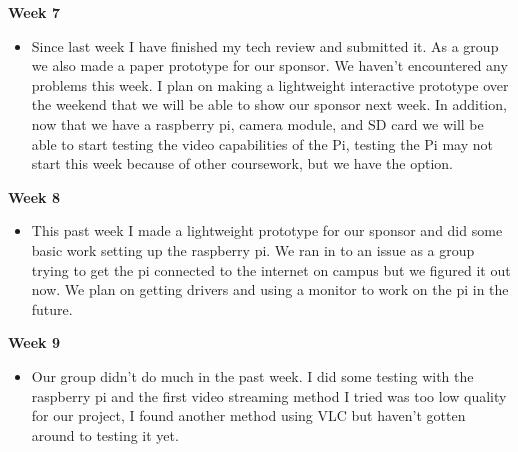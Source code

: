 \documentclass[onecolumn, draftclsnofoot,10pt, compsoc]{IEEEtran}
\begin{document}
        \textbf{Week 7}
        \begin{itemize}
            \item Since last week I have finished my tech review and submitted it. As a group we also made a paper prototype for our sponsor. We haven't encountered any problems this week. I plan on making a lightweight interactive prototype over the weekend that we will be able to show our sponsor next week. In addition, now that we have a raspberry pi, camera module, and SD card we will be able to start testing the video capabilities of the Pi, testing the Pi may not start this week because of other coursework, but we have the option.
        \end{itemize}
        \textbf{Week 8}
        \begin{itemize}
            \item This past week I made a lightweight prototype for our sponsor and did some basic work setting up the raspberry pi. We ran in to an issue as a group trying to get the pi connected to the internet on campus but we figured it out now. We plan on getting drivers and using a monitor to work on the pi in the future.
        \end{itemize}
        \textbf{Week 9}
        \begin{itemize}
            \item Our group didn't do much in the past week. I did some testing with the raspberry pi and the first video streaming method I tried was too low quality for our project, I found another method using VLC but haven't gotten around to testing it yet.
        \end{itemize}
        
\end{document}

